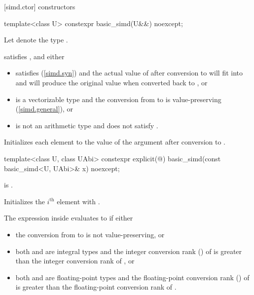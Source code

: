 [simd.ctor]{ constructors}

\begin{itemdecl}
template<class U> constexpr basic_simd(U&&) noexcept;
\end{itemdecl}

\begin{itemdescr}
  \pnum Let  denote the type .

  \pnum\constraints
   satisfies , and either
  \begin{itemize}
    \item {} satisfies \tcode{\constexprwrapperlike} (\ref{simd.syn})
      and the actual value of  after conversion to
       will fit into  and will produce the
      original value when converted back to , or

    \item {} is a vectorizable type and the conversion from
       to  is value-preserving
      (\ref{simd.general}), or

    \item {} is not an arithmetic type and does not satisfy
      \tcode{\constexprwrapperlike}.
  \end{itemize}

  \pnum\effects
  Initializes each element to the value of the argument after conversion to .
\end{itemdescr}

\begin{itemdecl}
template<class U, class UAbi>
  constexpr explicit(@\seebelow@) basic_simd(const basic_simd<U, UAbi>& x) noexcept;
\end{itemdecl}

\begin{itemdescr}
  \pnum\constraints
   is .

  \pnum\effects
  Initializes the $i^\text{th}$ element with  \foralli.

  \pnum\remarks
  The expression inside  evaluates to  if either
  \begin{itemize}
    \item the conversion from  to  is not
      value-preserving, or

    \item both  and  are integral types and the
      integer conversion rank () of  is greater than
      the integer conversion rank of , or

    \item both  and  are floating-point types and
      the floating-point conversion rank () of  is
      greater than the floating-point conversion rank of .
  \end{itemize}
\end{itemdescr}

